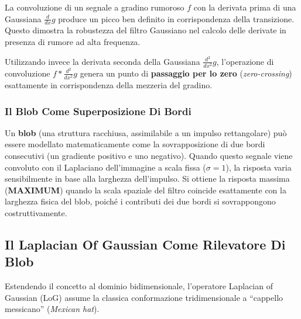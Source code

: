 ﻿\documentclass[11pt, a4paper]{article}
\begin{document}

La convoluzione di un segnale a gradino rumoroso $f$ con la derivata prima di una Gaussiana $\frac{d}{dx}g$ produce un picco ben definito in corrispondenza della transizione. Questo dimostra la robustezza del filtro Gaussiano nel calcolo delle derivate in presenza di rumore ad alta frequenza.


Utilizzando invece la derivata seconda della Gaussiana $\frac{d^2}{dx^2}g$, l'operazione di convoluzione $f * \frac{d^2}{dx^2}g$ genera un punto di \textbf{passaggio per lo zero} (\emph{zero-crossing}) esattamente in corrispondenza della mezzeria del gradino.

\subsubsection{Il Blob Come Superposizione Di Bordi}


Un \textbf{blob} (una struttura racchiusa, assimilabile a un impulso rettangolare) può essere modellato matematicamente come la sovrapposizione di due bordi consecutivi (un gradiente positivo e uno negativo). Quando questo segnale viene convoluto con il Laplaciano dell'immagine a scala fissa ($\sigma = 1$), la risposta varia sensibilmente in base alla larghezza dell'impulso. Si ottiene la risposta massima (\textbf{MAXIMUM}) quando la scala spaziale del filtro coincide esattamente con la larghezza fisica del blob, poiché i contributi dei due bordi si sovrappongono costruttivamente.

\subsection{Il Laplacian Of Gaussian Come Rilevatore Di Blob}

Estendendo il concetto al dominio bidimensionale, l'operatore Laplacian of Gaussian (LoG) assume la classica conformazione tridimensionale a ``cappello messicano'' (\emph{Mexican hat}).
\end{document}
